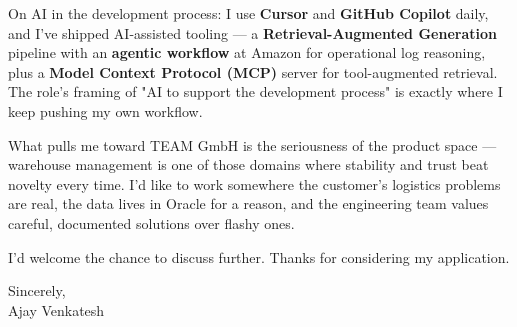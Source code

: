 \documentclass[letterpaper,11pt]{article}
\begin{document}
On AI in the development process: I use \textbf{Cursor} and \textbf{GitHub Copilot} daily, and I've shipped AI-assisted tooling --- a \textbf{Retrieval-Augmented Generation} pipeline with an \textbf{agentic workflow} at Amazon for operational log reasoning, plus a \textbf{Model Context Protocol (MCP)} server for tool-augmented retrieval. The role's framing of "AI to support the development process" is exactly where I keep pushing my own workflow.

What pulls me toward TEAM GmbH is the seriousness of the product space --- warehouse management is one of those domains where stability and trust beat novelty every time. I'd like to work somewhere the customer's logistics problems are real, the data lives in Oracle for a reason, and the engineering team values careful, documented solutions over flashy ones.

I'd welcome the chance to discuss further. Thanks for considering my application.

\vspace{12pt}

Sincerely, \\
Ajay Venkatesh
\end{document}
